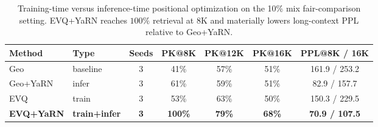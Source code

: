 \begin{table}[t]
\caption{Training-time versus inference-time positional optimization on the 10\% mix fair-comparison setting. EVQ+YaRN reaches \(100\%\) retrieval at \(8\mathrm{K}\) and materially lowers long-context PPL relative to Geo+YaRN.}
\label{tab:evq-yarn}
\centering
\small
\begin{tabular}{@{}l l c c c c c@{}}
\toprule
Method & Type & Seeds & PK@8K & PK@12K & PK@16K & PPL@8K / 16K \\
\midrule
Geo & baseline & 3 & 41\% & 57\% & 51\% & 161.9 / 253.2 \\
Geo+YaRN & infer & 3 & 61\% & 59\% & 51\% & 82.9 / 157.7 \\
EVQ & train & 3 & 53\% & 63\% & 50\% & 150.3 / 229.5 \\
\textbf{EVQ+YaRN} & \textbf{train+infer} & \textbf{3} & \textbf{100\%} & \textbf{79\%} & \textbf{68\%} & \textbf{70.9 / 107.5} \\
\bottomrule
\end{tabular}
\end{table}
